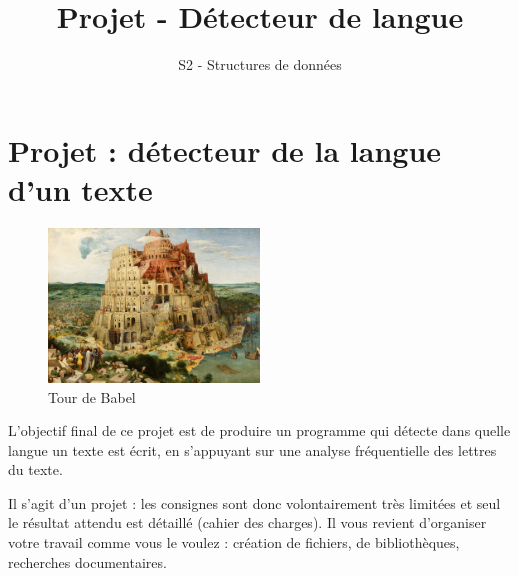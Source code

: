 \documentclass[
  letterpaper,
  DIV=11,
  numbers=noendperiod]{scrartcl}
\title{Projet - Détecteur de langue}
\subtitle{S2 - Structures de données}
\author{}
\date{}
\begin{document}
\maketitle
{}  \chead{} \cfoot{}   \renewcommand{\headrulewidth}{0pt} \renewcommand{\footrulewidth}{0pt} \thispagestyle{fancy} \vspace{-3cm}

\ifdefined\Shaded\renewenvironment{Shaded}{\begin{tcolorbox}[sharp corners, boxrule=0pt, interior hidden, frame hidden, borderline west={3pt}{0pt}{shadecolor}, enhanced, breakable]}{\end{tcolorbox}}\fi

\hypertarget{projet-duxe9tecteur-de-la-langue-dun-texte}{%
\section{Projet : détecteur de la langue d'un
texte}\label{projet-duxe9tecteur-de-la-langue-dun-texte}}

\begin{figure}

{\centering \includegraphics[width=0.5\textwidth,height=\textheight]{Pieter_Bruegel_the_Elder_-_The_Tower_of_Babel_(Vienna)_-_Google_Art_Project_-_edited.jpg}

}

\caption{Tour de Babel}

\end{figure}

L'objectif final de ce projet est de produire un programme qui détecte
dans quelle langue un texte est écrit, en s'appuyant sur une analyse
fréquentielle des lettres du texte.

Il s'agit d'un projet : les consignes sont donc volontairement très
limitées et seul le résultat attendu est détaillé (cahier des charges).
Il vous revient d'organiser votre travail comme vous le voulez :
création de fichiers, de bibliothèques, recherches documentaires.
\end{document}
